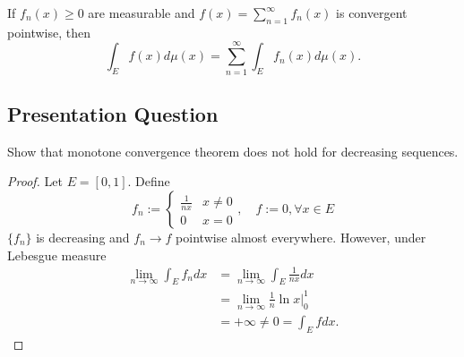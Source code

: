 \documentclass[class=book, crop=false]{standalone}
\begin{document}
        \begin{theorem}
            If $f_n(x) \geq 0$ are measurable and $f(x) = \sum^{\infty}_{n = 1} f_n(x)$ is convergent pointwise, then
            \begin{equation*}
                \int_E f(x) d\mu(x) = \sum^{\infty}_{n = 1} \int_E f_n(x) d\mu(x).
            \end{equation*}
        \end{theorem}
        
        \subsection{Presentation Question}
        \begin{question}
            Show that monotone convergence theorem does not hold for decreasing sequences.
        \end{question}
        \begin{proof}
            Let $E = [0, 1]$. Define
            \begin{equation*}
                f_n := \begin{cases}
                    \frac{1}{nx} & x \neq 0 \\
                    0 & x = 0
                \end{cases}, \quad f := 0,  \forall x \in E
            \end{equation*}
            $\{f_n\}$ is decreasing and $f_n \rightarrow f$ pointwise almost everywhere. However, under Lebesgue measure
            \begin{align*}
                \lim_{n \rightarrow \infty} \int_E f_n dx &= \lim_{n \rightarrow \infty} \int_E \frac{1}{nx} dx \\
                &= \lim_{n \rightarrow \infty} \frac{1}{n} \ln{x}\bigg|^{1}_{0} \\
                &= +\infty \neq 0 = \int_E f dx.
            \end{align*}
        \end{proof}
\end{document}
